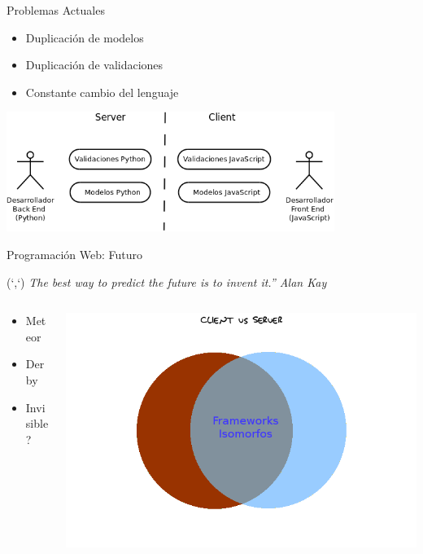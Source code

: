 \documentclass[xcolor=dvipsnames, 14pt]{beamer}
\newenvironment{reference}[2]{%
  \begin{textblock*}{\textwidth}(#1,#2)
      \footnotesize\it\bgroup\color{gray!50!black}}{\egroup\end{textblock*}}
\begin{document}
\begin{frame}{Problemas Actuales}
    \begin{itemize}
        \item Duplicación de modelos
        \item Duplicación de validaciones
        \item Constante cambio del lenguaje
    \end{itemize}
    \begin{center}
        \includegraphics[width=0.8\textwidth]{img/problemas.png}
    \end{center}
\end{frame}

\begin{frame}{Programación Web: Futuro}
\begin{reference}{4mm}{13mm}
``The best way to predict the future is to invent it.'' Alan Kay
\end{reference}

\begin{columns}
    \begin{column}{0.3\textwidth}
        \begin{itemize}
            \item Meteor
            \item Derby
            \item Invisible?
        \end{itemize}
    \end{column}
    \begin{column}{0.7\textwidth}
        \begin{center}
            \includegraphics[width=\textwidth]{img/futuro.png}
        \end{center}
    \end{column}
\end{columns}

\end{frame}
\end{document}
